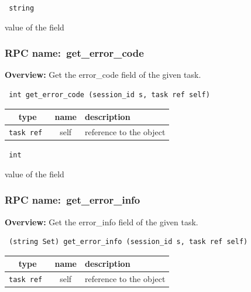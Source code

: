 \vspace{0.3cm}

{\tt 
string
}


value of the field
\vspace{0.3cm}
\vspace{0.3cm}
\vspace{0.3cm}
\subsubsection{RPC name:~get\_error\_code}

{\bf Overview:} 
Get the error\_code field of the given task.

\begin{verbatim} int get_error_code (session_id s, task ref self)\end{verbatim}



 
\vspace{0.3cm}
\begin{tabular}{|c|c|p{7cm}|}
 \hline
{\bf type} & {\bf name} & {\bf description} \\ \hline
{\tt task ref } & self & reference to the object \\ \hline 

\end{tabular}

\vspace{0.3cm}

{\tt 
int
}


value of the field
\vspace{0.3cm}
\vspace{0.3cm}
\vspace{0.3cm}
\subsubsection{RPC name:~get\_error\_info}

{\bf Overview:} 
Get the error\_info field of the given task.

\begin{verbatim} (string Set) get_error_info (session_id s, task ref self)\end{verbatim}



 
\vspace{0.3cm}
\begin{tabular}{|c|c|p{7cm}|}
 \hline
{\bf type} & {\bf name} & {\bf description} \\ \hline
{\tt task ref } & self & reference to the object \\ \hline 

\end{tabular}

